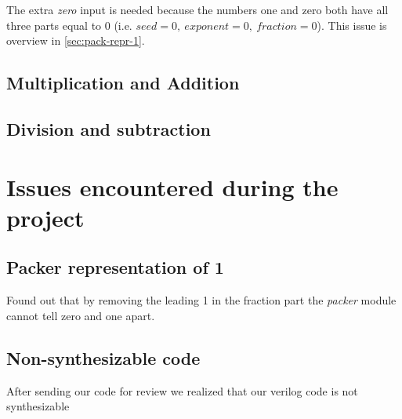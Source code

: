 \documentclass[10pt]{article}
\begin{document}
The extra \textit{zero} input is needed because the numbers one and zero both
have all three parts equal to 0 (i.e. $seed=0,\ exponent=0,\ fraction=0$).
This issue is overview in \autoref{sec:pack-repr-1}.

\subsection{Multiplication and Addition}\label{sec:mult-addit}

\subsection{Division and subtraction}\label{sec:division-subtraction}


\section{Issues encountered during the project}\label{sec:issu-enco-during}

\subsection{Packer representation of 1}
\label{sec:pack-repr-1}

Found out that by removing the leading 1 in the fraction part the
\textit{packer} module cannot tell zero and one apart.

\subsection{Non-synthesizable code}
\label{sec:non-synth-code}

After sending our code for review we realized that our verilog code is not synthesizable
\end{document}
